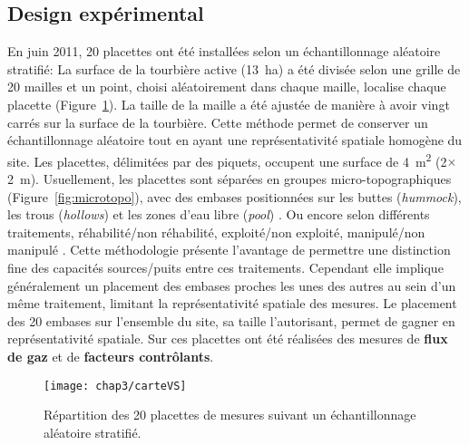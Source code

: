 \subsection{Design expérimental}

En juin 2011, 20 placettes ont été installées selon un échantillonnage aléatoire stratifié:
La surface de la tourbière active (\SI{13}{\hectare}) a été divisée selon une grille de 20 mailles et un point, choisi aléatoirement dans chaque maille, localise chaque placette (Figure~\ref{fig:carteVS}).
La taille de la maille a été ajustée de manière à avoir vingt carrés sur la surface de la tourbière.
Cette méthode permet de conserver un échantillonnage aléatoire tout en ayant une représentativité spatiale homogène du site. 
Les placettes, délimitées par des piquets, occupent une surface de \SI{4}{\square\metre} (2$\times$\SI{2}{\metre}).
Usuellement, les placettes sont séparées en groupes micro-topographiques (Figure~\ref{fig:microtopo}), avec des embases positionnées sur les buttes (\textit{hummock}), les trous (\textit{hollows}) et les zones d'eau libre (\textit{pool}) \citep{Alm1997,waddington2000}.
Ou encore selon différents traitements, réhabilité/non réhabilité, exploité/non exploité, manipulé/non manipulé \citep{bortoluzzi2006a,strack2013}.
Cette méthodologie présente l'avantage de permettre une distinction fine des capacités sources/puits entre ces traitements.
Cependant elle implique généralement un placement des embases proches les unes des autres au sein d'un même traitement, limitant la représentativité spatiale des mesures.
Le placement des 20 embases sur l'ensemble du site, sa taille l'autorisant, permet de gagner en représentativité spatiale.
Sur ces placettes ont été réalisées des mesures de \textbf{flux de gaz} et de \textbf{facteurs contrôlants}.

\begin{figure}
\centering
\texttt{[image: chap3/carteVS]}
\caption{Répartition des 20 placettes de mesures suivant un échantillonnage aléatoire stratifié.}
\label{fig:carteVS}
\end{figure}

